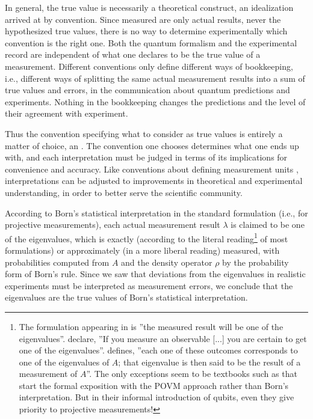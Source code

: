 \documentclass[12pt]{article}
\begin{document}
In general, the true value is necessarily a theoretical construct, an
idealization arrived at by convention.
Since measured are only actual results, never the hypothesized true
values, there is no way to determine experimentally which convention is
the right one. Both the quantum formalism and the experimental record
are independent of what one declares to be the true value of a
measurement. Different conventions only define different ways of
bookkeeping, i.e., different ways of splitting the same actual
measurement results into a sum of true values and errors, in the
communication about quantum predictions and experiments. Nothing in the
bookkeeping changes the predictions and the level of their agreement
with experiment.

Thus the convention specifying what to consider as true values is
entirely a matter of choice, an . The convention
one chooses determines what one ends up with, and each interpretation
must be judged in terms of its implications for convenience and
accuracy. Like conventions about defining measurement units
\cite{SIunits}, interpretations can be adjusted to improvements in
theoretical and experimental understanding, in order to better serve
the scientific community.


According to Born's statistical interpretation in the standard
formulation (i.e., for projective measurements),
each actual measurement result $\lambda$ is claimed to be one of the
eigenvalues, which is exactly (according to the literal
reading\footnote{\label{f.proj}
The formulation appearing in  \cite{Wik.Born} is
''the measured result will be one of the eigenvalues''.
 \cite[p.133]{GriS} declare, ''If you
measure an observable [...] you are certain to get one of the
eigenvalues''.  \cite[p.95]{Peres} defines, ''each one of
these outcomes corresponds to one of the eigenvalues of $A$; that
eigenvalue is then said to be the result of a measurement of $A$''.
The only exceptions seem to be textbooks such as
 \cite[p.84f]{NieC} that start the formal
exposition with the POVM approach rather than Born's interpretation.
But in their informal introduction of qubits, even they give priority 
to projective measurements!
} %
 of most formulations) or approximately (in a more liberal
reading) measured, with probabilities computed from $A$ and the density
operator $\rho$ by the probability form of Born's rule. Since we saw
that deviations from the eigenvalues in realistic experiments must
be interpreted as measurement errors, we conclude that the eigenvalues
are the true values of Born's statistical interpretation.
\end{document}
